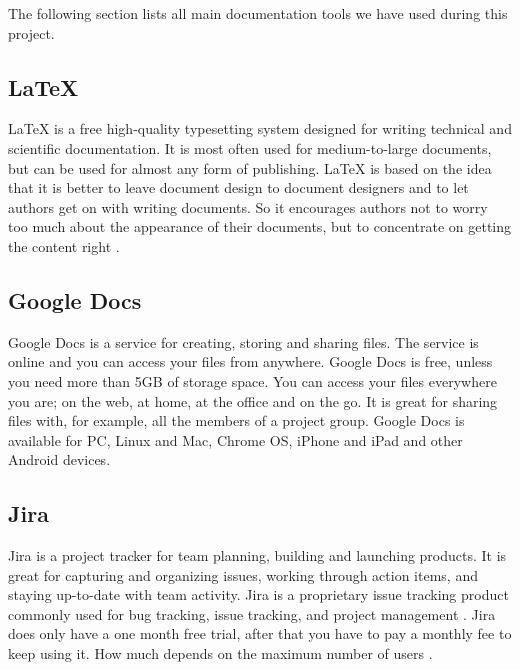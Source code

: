 
The following section lists all main documentation tools we have used during this project.

\subsection{LaTeX}
LaTeX is a free high-quality typesetting system designed for writing technical and scientific documentation. It is most often used for medium-to-large documents, but can be used for almost any form of publishing. 
\newline
\newline
LaTeX is based on the idea that it is better to leave document design to document designers and to let authors get on with writing documents. So it encourages authors not to worry too much about the appearance of their documents, but to concentrate on getting the content right \cite{bib:latex}.

\subsection{Google Docs}
Google Docs is a service for creating, storing and sharing files. The service is online and you can access your files from anywhere. Google Docs is free, unless you need more than 5GB of storage space. You can access your files everywhere you are; on the web, at home, at the office and on the go. It is great for sharing files with, for example, all the members of a project group. Google Docs is available for PC, Linux and Mac, Chrome OS, iPhone and iPad and other Android devices.

\newpage

\subsection{Jira}
Jira is a project tracker for team planning, building and launching products. It is great for capturing and organizing issues, working through action items, and staying up-to-date with team activity. Jira is a proprietary issue tracking product commonly used for bug tracking, issue tracking, and project management \cite{bib:atlassian}.
\newline
\newline
Jira does only have a one month free trial, after that you have to pay a monthly fee to keep using it. How much depends on the maximum number of users \cite{bib:jira}.

